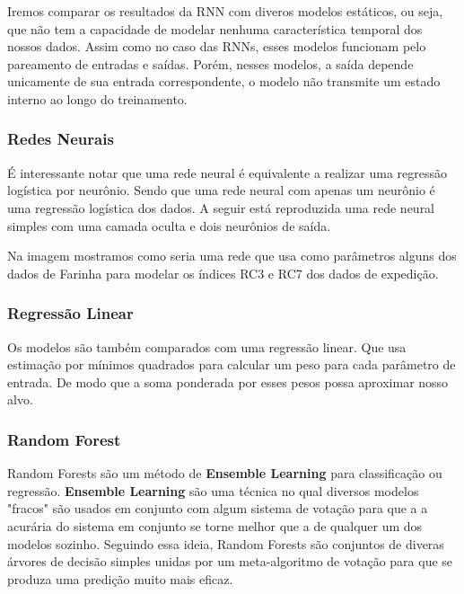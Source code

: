 Iremos comparar os resultados da RNN com diveros modelos estáticos, ou seja, que não tem a capacidade de modelar nenhuma característica temporal dos nossos dados. Assim como no caso das RNNs, esses modelos funcionam pelo pareamento de entradas e saídas. Porém, nesses modelos, a saída depende unicamente de sua entrada correspondente, o modelo não transmite um estado interno ao longo do treinamento.



\subsubsection{Redes Neurais}




É interessante notar que uma rede neural é equivalente a realizar uma regressão logística por neurônio. Sendo que uma rede neural com apenas um neurônio é uma regressão logística dos dados. A seguir está reproduzida uma rede neural simples com uma camada oculta e dois neurônios de saída.




%



Na imagem mostramos como seria uma rede que usa como parâmetros alguns dos dados de Farinha para modelar os índices RC3 e RC7 dos dados de expedição.

\bigskip
\subsubsection{Regressão Linear}
Os modelos são também comparados com uma regressão linear. Que usa estimação por mínimos quadrados para calcular um peso para cada parâmetro de entrada. De modo que a soma ponderada por esses pesos possa aproximar nosso alvo.


\subsubsection{Random Forest}

Random Forests são um método de \textbf{Ensemble Learning} para classificação ou regressão. \textbf{Ensemble Learning} são uma técnica no qual diversos modelos "fracos" são usados em conjunto com algum sistema de votação para que a a acurária do sistema em conjunto se torne melhor que a de qualquer um dos modelos sozinho. Seguindo essa ideia, Random Forests são conjuntos de diveras árvores de decisão simples unidas por um meta-algoritmo de votação para que se produza uma predição muito mais eficaz.




